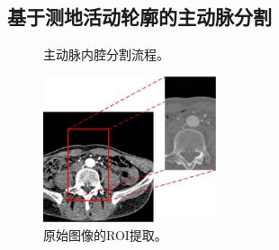 \subsection[主动脉分割]{基于测地活动轮廓的主动脉分割}

\begin{frame}
\begin{figure}[t]
\centering

\caption[主动脉内腔分割流程]{主动脉内腔分割流程。}
\label{fig:aorta_data_flow}
\end{figure}
\end{frame}

\begin{frame}
\begin{figure}[t]
\centering
\includegraphics[width=2.0in]{../../Figures/gac/ROI.eps}
\caption[原始图像的ROI提取]{原始图像的ROI提取。}
\label{fig:aorta_roi}
\end{figure}
\end{frame}

